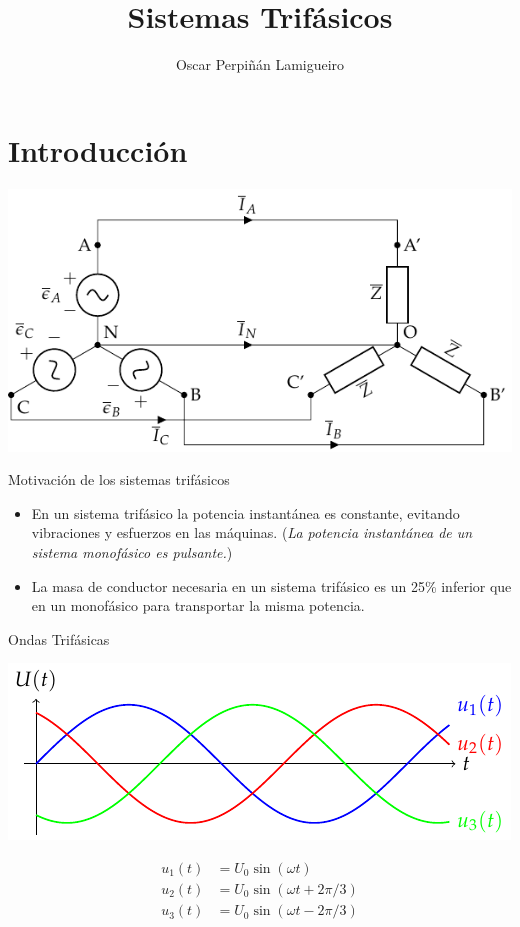 \documentclass[aspectratio=169, usenames,svgnames,dvipsnames]{beamer}
\author{Oscar Perpiñán Lamigueiro}
\date{}
\title{Sistemas Trifásicos}
\begin{document}
\maketitle

\section{Introducción}
\label{sec:orgfc846af}

\begin{frame}[label={sec:orgd7567c0},plain]{}
\begin{center}
\includegraphics[width=.9\linewidth]{../figs/EstrellaEquilibrado.pdf}
\end{center}
\end{frame}

\begin{frame}[label={sec:org909009b}]{Motivación de los sistemas trifásicos}
\begin{itemize}
\item En un sistema trifásico la potencia instantánea es constante, evitando vibraciones y esfuerzos en las máquinas. (\emph{La potencia instantánea de un sistema monofásico es pulsante.})

\item La masa de conductor necesaria en un sistema trifásico es un 25\% inferior que en un monofásico para transportar la misma potencia.
\end{itemize}
\end{frame}

\begin{frame}[label={sec:org4e454ae}]{Ondas Trifásicas}
\begin{center}
\includegraphics[width=.9\linewidth]{../figs/TensionesTrifasica.pdf}
\end{center}

\begin{align*}
  u_1(t) &= U_0 \sin(\omega t)\\
  u_2(t) &= U_0 \sin(\omega t + 2\pi/3)\\
  u_3(t) &= U_0 \sin(\omega t - 2\pi/3)
\end{align*}
\end{frame}
\end{document}
